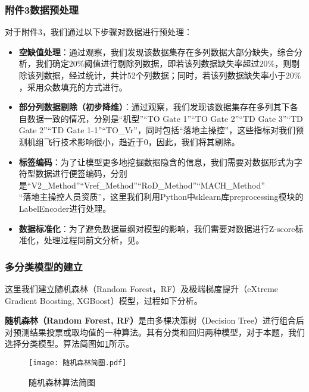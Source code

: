 \documentclass{MathorCupModeling}
\begin{document}
	\subsubsection{附件3数据预处理}
	对于附件3，我们通过以下步骤对数据进行预处理：
	\begin{itemize}
		\item \textbf{空缺值处理}：通过观察，我们发现该数据集存在多列数据大部分缺失，综合分析，我们确定$20\%$阈值进行剔除列数据，即若该列数据缺失率超过$20\%$，则剔除该列数据，经过统计，共计52个列数据；同时，若该列数据缺失率小于$20\%$，采用众数填充的方式进行。
		\item \textbf{部分列数据剔除（初步降维）}：通过观察，我们发现该数据集存在多列其下各自数据一致的情况，分别是“机型”“TO Gate 1”“TO Gate 2”“TD Gate 3”“TD Gate 2”“TD Gate 1-1”“TO\_Vr”，同时包括“落地主操控”，这些指标对我们预测机组飞行技术影响很小，趋近于0，因此，我们将其剔除。
		\item \textbf{标签编码}：为了让模型更多地挖掘数据隐含的信息，我们需要对数据形式为字符型数据进行便签编码，分别是“V2\_Method”“Vref\_Method”“RoD\_Method”“MACH\_Method”\\“落地主操控人员资质”，这里我们利用Python中sklearn库preprocessing模块的LabelEncoder进行处理。
		\item \textbf{数据标准化}：为了避免数据量纲对模型的影响，我们需要对数据进行Z-score标准化，处理过程同前文分析，见\textcolor{blue}{}。
	\end{itemize}
	\subsubsection{多分类模型的建立}\label{RF-XGBoost}
	这里我们建立随机森林（Random Forest，RF）及极端梯度提升（eXtreme Gradient Boosting, XGBoost）模型，过程如下分析。
	
	\textbf{随机森林（Random Forest, RF）}是由多棵决策树（Decision Tree）进行组合后对预测结果投票或取均值的一种算法\textcolor{blue}{\cite{Paper:随机森林}}。其有分类和回归两种模型，对于本题，我们选择分类模型。算法简图如\textcolor{blue}{\cref{fig:随机森林简图}}所示。
	\begin{figure}[H]
		\centering
		\texttt{[image: 随机森林简图.pdf]}
		\caption{随机森林算法简图}
		\label{fig:随机森林简图}
	\end{figure}
\end{document}
